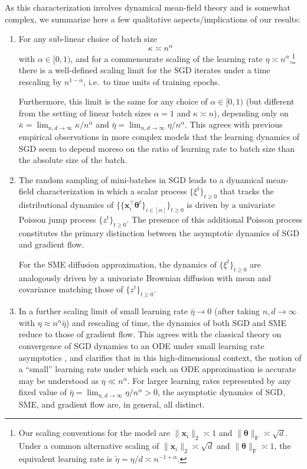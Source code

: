\documentclass[11pt,letterpaper,reqno]{amsart}
\theoremstyle{definition}
\def\sF{\mathrm{F}}
\def\x{\mathbf{x}}
\def\btheta{\boldsymbol{\theta}}
\begin{document}
As this characterization involves dynamical mean-field theory and
is somewhat complex, we summarize here a few qualitative aspects/implications
of our results:

\begin{enumerate}[1.]
\item For any sub-linear choice of batch size
\[\kappa \asymp n^\alpha\]
with $\alpha \in [0,1)$, and for a commensurate scaling of the learning rate
$\eta \asymp n^\alpha$,\footnote{Our scaling conventions for the model are $\|\x_i\|_2 \asymp
1$ and $\|\btheta\|_\sF \asymp \sqrt{d}$. Under a common alternative scaling of
$\|\x_i\|_2 \asymp \sqrt{d}$ and $\|\btheta\|_\sF \asymp 1$, the equivalent
learning rate is $\tilde \eta=\eta/d \asymp n^{-1+\alpha}$.} there is a well-defined scaling limit for
the SGD iterates under a time rescaling by $n^{1-\alpha}$,
i.e.\ to time units of training epochs.

Furthermore, this limit is the same for any choice of $\alpha \in [0,1)$ (but
different from the setting of linear batch sizes $\alpha=1$ and $\kappa
\asymp n$), depending only
on $\bar\kappa=\lim_{n,d \to \infty} \kappa/n^\alpha$ and
$\bar \eta=\lim_{n,d \to \infty} \eta/n^\alpha$. This agrees with previous
empirical observations in more complex models
\cite{jastrzkebski2017three,he2019control} that the learning
dynamics of SGD seem to depend moreso on the ratio of learning rate to batch
size than the absolute size of the batch.\\

\item The random sampling of mini-batches in SGD leads to a dynamical
mean-field characterization in which a scalar process $\{\xi^t\}_{t \geq 0}$
that tracks the distributional dynamics of $\{\{\x_i^\top \btheta^t\}_{i \in
[n]}\}_{t \geq 0}$ is
driven by a univariate Poisson jump process $\{z^t\}_{t \geq 0}$.
The presence of this additional Poisson process constitutes the primary
distinction between the asymptotic dynamics of SGD and gradient flow.

For the SME diffusion approximation, the dynamics of $\{\xi^t\}_{t \geq 0}$ are
analogously driven by a univariate Brownian diffusion with mean and covariance 
matching those of $\{z^t\}_{t \geq 0}$.\\

\item In a further scaling limit of small learning rate $\bar \eta \to 0$ (after
taking $n,d \to \infty$ with $\eta \approx n^\alpha \bar \eta$) and
rescaling of time, the dynamics of both
SGD and SME reduce to those of gradient flow. This agrees with the classical
theory on convergence of SGD dynamics to an ODE under small learning rate
asymptotics \cite{kushner2003stochastic}, and clarifies that in this high-dimensional context,
the notion of a ``small'' learning rate under which such an ODE approximation
is accurate may be understood as $\eta \ll 
n^\alpha$. For larger learning rates represented by any
fixed value of $\bar \eta=\lim_{n,d \to \infty} \eta/n^\alpha>0$, the asymptotic dynamics of SGD, SME, and
gradient flow are, in general, all distinct.\\


\end{enumerate}
\end{document}
